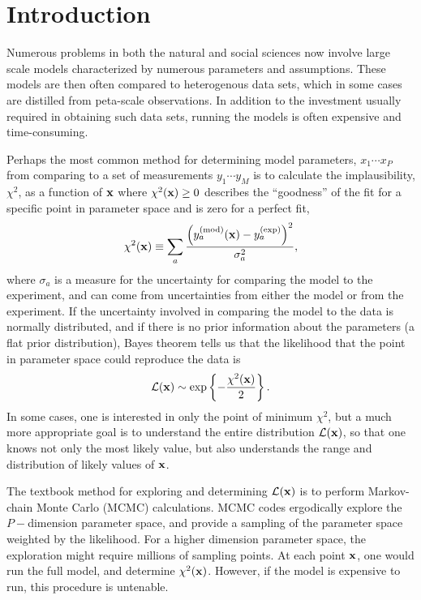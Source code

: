 \section{Introduction}

Numerous problems in both the natural and social sciences now involve large scale models characterized by numerous parameters and assumptions. These models are then often compared to heterogenous data sets, which in some cases are distilled from peta-scale observations. In addition to the investment usually required in obtaining such data sets, running the models is often expensive and time-consuming. 

Perhaps the most common method for determining model parameters, $x_1\cdots x_P$ from comparing to a set of measurements $y_1\cdots y_M$ is to calculate the implausibility, $\chi^2$, as a function of ${\bf x}$ where $\chi^2({\bf x})\ge 0$ describes the ``goodness'' of the fit for a specific point in parameter space and is zero for a perfect fit,
\begin{equation}
\chi^2({\bf x})\equiv
\sum_a \frac{\left(y_a^{\rm(mod)}({\bf x})-y_a^{\rm(exp)}\right)^2}{\sigma_a^2},
\end{equation}
where $\sigma_a$ is a measure for the uncertainty for comparing the model to the experiment, and can come from uncertainties from either the model or from the experiment. If the uncertainty involved in comparing the model to the data is normally distributed, and if there is no prior information about the parameters (a flat prior distribution), Bayes theorem tells us that the likelihood that the point in parameter space could reproduce the data is
\begin{equation}
\mathcal{L}({\bf x})\sim \exp\left\{-\frac{\chi^2({\bf x})}{2}\right\}.
\end{equation}
In some cases, one is interested in only the point of minimum $\chi^2$, but a much more appropriate goal is to understand the entire distribution $\mathcal{L}({\bf x})$, so that one knows not only the most likely value, but also understands the range and distribution of likely values of ${\bf x}$. 

The textbook method for exploring and determining $\mathcal{L}({\bf x})$ is to perform Markov-chain Monte Carlo (MCMC) calculations. MCMC codes ergodically explore the $P-$dimension parameter space, and provide a sampling of the parameter space weighted by the likelihood. For a higher dimension parameter space, the exploration might require millions of sampling points. At each point ${\bf x}$, one would run the full model, and determine $\chi^2({\bf x})$. However, if the model is expensive to run, this procedure is untenable.


